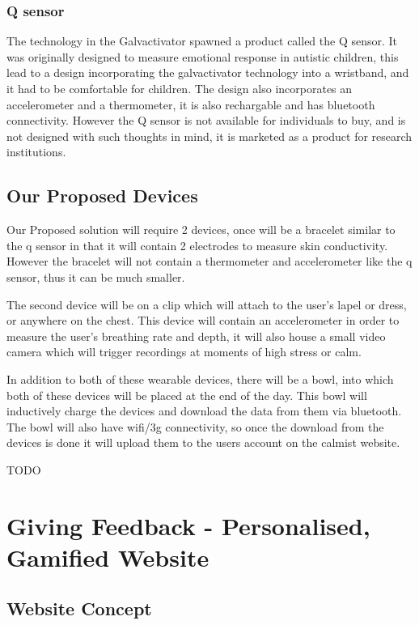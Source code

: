\documentclass{scrartcl}
\begin{document}
\subsubsection{Q sensor}
The technology in the Galvactivator spawned a product called the Q sensor. It was originally 
designed to measure emotional response in autistic children, this lead to a design incorporating
the galvactivator technology into a wristband, and it had to be comfortable for children. The
design also incorporates an accelerometer and a thermometer, it is also rechargable and has
bluetooth connectivity. However the Q sensor is not available for individuals to buy, and is
not designed with such thoughts in mind, it is marketed as a product for research institutions.

\subsection{Our Proposed Devices}
Our Proposed solution will require 2 devices, once will be a bracelet similar to the q sensor in
that it will contain 2 electrodes to measure skin conductivity. However the bracelet will not
contain a thermometer and accelerometer like the q sensor, thus it can be much smaller.

The second device will be on a clip which will attach to the user's lapel or dress, or anywhere
on the chest. This device will contain an accelerometer in order to measure the user's breathing
rate and depth, it will also house a small video camera which will trigger recordings at 
moments of high stress or calm.

In addition to both of these wearable devices, there will be a bowl, into which both of these
devices will be placed at the end of the day. This bowl will inductively charge the devices and
download the data from them via bluetooth. The bowl will also have wifi/3g connectivity, so once
the download from the devices is done it will upload them to the users account on the calmist
website.


TODO

\section{Giving Feedback - Personalised, Gamified Website}

\subsection{Website Concept}
\end{document}
